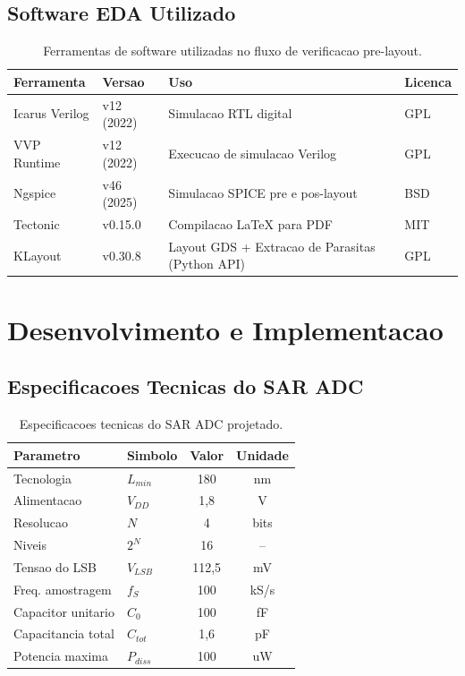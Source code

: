 \documentclass[12pt, a4paper]{article}
\begin{document}
\subsection{Software EDA Utilizado}

\begin{table}[h!]
\centering
\caption{Ferramentas de software utilizadas no fluxo de verificacao pre-layout.}
\label{tab:tools}
\begin{tabular}{llll}
\toprule
\textbf{Ferramenta} & \textbf{Versao} & \textbf{Uso} & \textbf{Licenca} \\
\midrule
Icarus Verilog & v12 (2022) & Simulacao RTL digital & GPL \\
VVP Runtime    & v12 (2022) & Execucao de simulacao Verilog & GPL \\
Ngspice        & v46 (2025) & Simulacao SPICE pre e pos-layout & BSD \\
Tectonic       & v0.15.0    & Compilacao LaTeX para PDF & MIT \\
KLayout        & v0.30.8    & Layout GDS + Extracao de Parasitas (Python API) & GPL \\
\bottomrule
\end{tabular}
\end{table}

\section{Desenvolvimento e Implementacao}

\subsection{Especificacoes Tecnicas do SAR ADC}

\begin{table}[h!]
\centering
\caption{Especificacoes tecnicas do SAR ADC projetado.}
\label{tab:specs}
\begin{tabular}{llcc}
\toprule
\textbf{Parametro} & \textbf{Simbolo} & \textbf{Valor} & \textbf{Unidade} \\
\midrule
Tecnologia         & $L_{min}$  & 180     & nm \\
Alimentacao        & $V_{DD}$   & 1,8     & V \\
Resolucao          & $N$        & 4       & bits \\
Niveis             & $2^N$      & 16      & -- \\
Tensao do LSB      & $V_{LSB}$  & 112,5   & mV \\
Freq. amostragem   & $f_S$      & 100     & kS/s \\
Capacitor unitario & $C_0$      & 100     & fF \\
Capacitancia total & $C_{tot}$  & 1,6     & pF \\
Potencia maxima    & $P_{diss}$ & 100     & uW \\
\bottomrule
\end{tabular}
\end{table}
\end{document}
